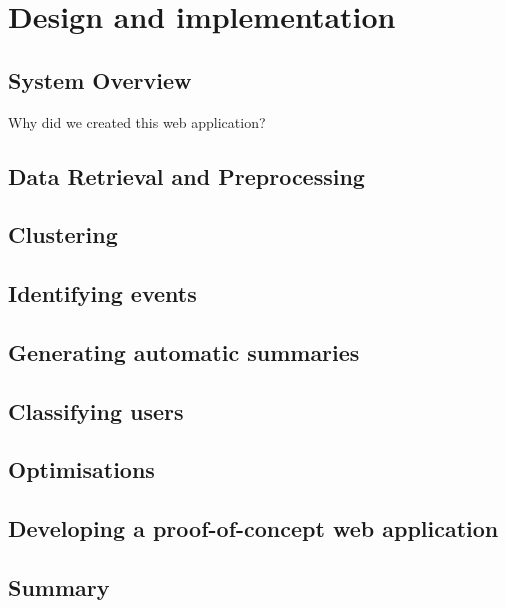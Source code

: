 \chapter{Design and implementation}
\ifpdf
    \graphicspath{{Chapter3/Chapter3Figs/PNG/}{Chapter3/Chapter3Figs/PDF/}{Chapter3/Chapter3Figs/}}
\else
    \graphicspath{{Chapter3/Chapter3Figs/EPS/}{Chapter3/Chapter3Figs/}}
\fi

\section{System Overview}
Why did we created this web application?

\section{Data Retrieval and Preprocessing}

\section{Clustering}

\section{Identifying events}

\section{Generating automatic summaries}

\section{Classifying users}

\section{Optimisations}

\section{Developing a proof-of-concept web application}

\section{Summary}



